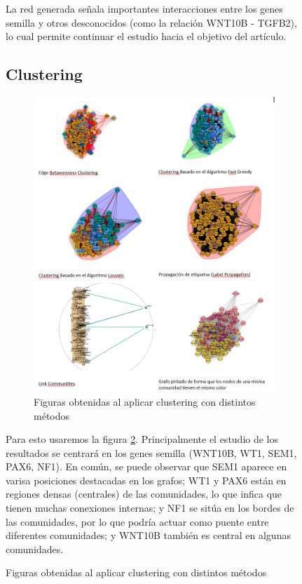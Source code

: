 \begin{figure}[h]
{La red generada señala importantes interacciones entre los genes semilla y otros desconocidos (como la relación WNT10B - TGFB2), lo cual permite continuar el estudio hacia el objetivo del artículo.


\subsection{Clustering}

\begin{figure}[!h] %
	\centering
	\includegraphics[width=1\textwidth]{figures/toda_figuras_clustering.png}
	\caption{Figuras obtenidas al aplicar clustering con distintos métodos}
	\label{clustering}
\end{figure}

Para esto usaremos la figura \ref{clustering}. Principalmente el estudio de los resultados se centrará en los genes semilla (WNT10B, WT1, SEM1, PAX6, NF1). En común, se puede observar que SEM1 aparece en varisa posiciones destacadas en los grafos; WT1 y PAX6 están en regiones densas (centrales) de las comunidades, lo que infica que tienen muchas conexiones internas; y NF1 se sitúa en los bordes de las comunidades, por lo que podría actuar como puente entre diferentes comunidades; y WNT10B también es central en algunas comunidades.


}
\end{figure}
